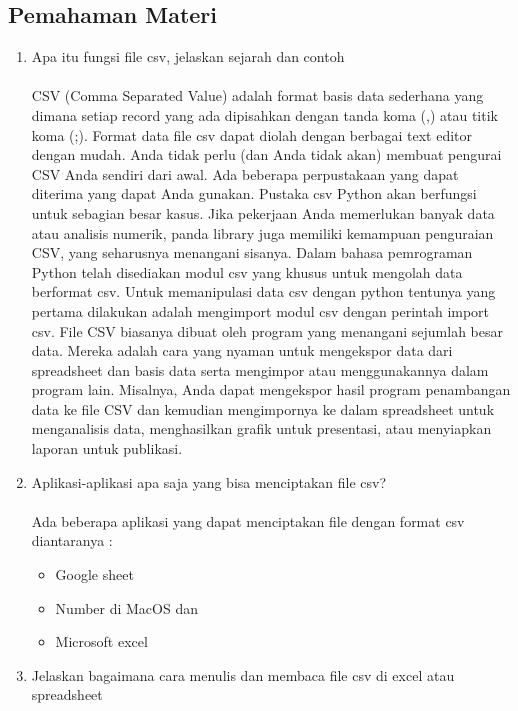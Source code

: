 \subsection{Pemahaman Materi}
\begin{enumerate}
\item Apa itu fungsi ﬁle csv, jelaskan sejarah dan contoh
\paragraph{} CSV (Comma Separated Value) adalah format basis data sederhana yang dimana setiap record yang ada dipisahkan dengan tanda koma (,) atau titik koma (;). Format data file csv dapat diolah dengan berbagai text editor dengan mudah. Anda tidak perlu (dan Anda tidak akan) membuat pengurai CSV Anda sendiri dari awal. Ada beberapa perpustakaan yang dapat diterima yang dapat Anda gunakan. Pustaka csv Python akan berfungsi untuk sebagian besar kasus. Jika pekerjaan Anda memerlukan banyak data atau analisis numerik, panda library juga memiliki kemampuan penguraian CSV, yang seharusnya menangani sisanya. Dalam bahasa pemrograman Python telah disediakan modul csv yang khusus untuk mengolah data berformat csv.  Untuk memanipulasi data csv dengan python tentunya yang pertama dilakukan adalah mengimport modul csv dengan perintah import csv. File CSV biasanya dibuat oleh program yang menangani sejumlah besar data. Mereka adalah cara yang nyaman untuk mengekspor data dari spreadsheet dan basis data serta mengimpor atau menggunakannya dalam program lain. Misalnya, Anda dapat mengekspor hasil program penambangan data ke file CSV dan kemudian mengimpornya ke dalam spreadsheet untuk menganalisis data, menghasilkan grafik untuk presentasi, atau menyiapkan laporan untuk publikasi.

\item Aplikasi-aplikasi apa saja yang bisa menciptakan ﬁle csv?
\paragraph{} Ada beberapa aplikasi yang dapat menciptakan file dengan format csv diantaranya :
\begin{itemize}
    \item Google sheet
    \item Number di MacOS dan 
    \item Microsoft excel
\end{itemize}
\item Jelaskan bagaimana cara menulis dan membaca ﬁle csv di excel atau spreadsheet

\end{enumerate}
